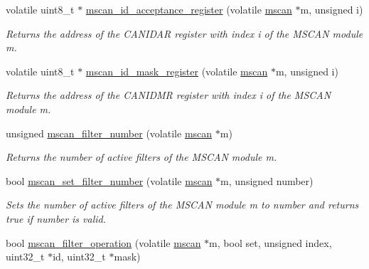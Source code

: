 \begin{DoxyCompactItemize}
volatile uint8\+\_\+t $\ast$ \mbox{\hyperlink{group__RTEMSBSPsPowerPCGen5200MSCAN_gadfc7768cf5d070c658a72c4c4a52ec48}{mscan\+\_\+id\+\_\+acceptance\+\_\+register}} (volatile \mbox{\hyperlink{group__RTEMSBSPsPowerPCGen5200MSCAN_gacfd56a4a482c5e7da2cff003284b2d51}{mscan}} $\ast$m, unsigned i)
\begin{DoxyCompactList}\small\item\em Returns the address of the C\+A\+N\+I\+D\+AR register with index {\itshape i} of the M\+S\+C\+AN module {\itshape m}. \end{DoxyCompactList}\item 
volatile uint8\+\_\+t $\ast$ \mbox{\hyperlink{group__RTEMSBSPsPowerPCGen5200MSCAN_ga59f5c272b5395fa083348d087fd4c34e}{mscan\+\_\+id\+\_\+mask\+\_\+register}} (volatile \mbox{\hyperlink{group__RTEMSBSPsPowerPCGen5200MSCAN_gacfd56a4a482c5e7da2cff003284b2d51}{mscan}} $\ast$m, unsigned i)
\begin{DoxyCompactList}\small\item\em Returns the address of the C\+A\+N\+I\+D\+MR register with index {\itshape i} of the M\+S\+C\+AN module {\itshape m}. \end{DoxyCompactList}\item 
unsigned \mbox{\hyperlink{group__RTEMSBSPsPowerPCGen5200MSCAN_gae319b1e5e7cf1062871cf930633ccf0c}{mscan\+\_\+filter\+\_\+number}} (volatile \mbox{\hyperlink{group__RTEMSBSPsPowerPCGen5200MSCAN_gacfd56a4a482c5e7da2cff003284b2d51}{mscan}} $\ast$m)
\begin{DoxyCompactList}\small\item\em Returns the number of active filters of the M\+S\+C\+AN module {\itshape m}. \end{DoxyCompactList}\item 
bool \mbox{\hyperlink{group__RTEMSBSPsPowerPCGen5200MSCAN_gab1e2410b46710969d0b6c886e1eb4eb4}{mscan\+\_\+set\+\_\+filter\+\_\+number}} (volatile \mbox{\hyperlink{group__RTEMSBSPsPowerPCGen5200MSCAN_gacfd56a4a482c5e7da2cff003284b2d51}{mscan}} $\ast$m, unsigned number)
\begin{DoxyCompactList}\small\item\em Sets the number of active filters of the M\+S\+C\+AN module {\itshape m} to {\itshape number} and returns true if {\itshape number} is valid. \end{DoxyCompactList}\item 
bool \mbox{\hyperlink{group__RTEMSBSPsPowerPCGen5200MSCAN_gafae77c5bbc712dd3fe5e7432462e3d08}{mscan\+\_\+filter\+\_\+operation}} (volatile \mbox{\hyperlink{group__RTEMSBSPsPowerPCGen5200MSCAN_gacfd56a4a482c5e7da2cff003284b2d51}{mscan}} $\ast$m, bool set, unsigned index, uint32\+\_\+t $\ast$id, uint32\+\_\+t $\ast$mask)

\end{DoxyCompactItemize}
